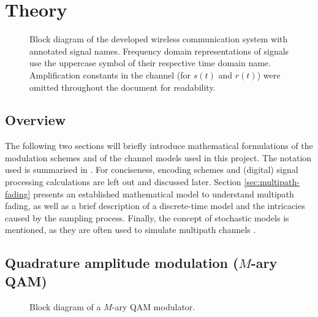 
\chapter{Theory} \label{chp:theory}

\begin{figure}
	\centering
	\resizebox{.9\linewidth}{!}{
		
	}
	\caption{
		Block diagram of the developed wireless communication system with annotated signal names. Frequency domain representations of signals use the uppercase symbol of their respective time domain name. Amplification constants in the channel (for \(s(t)\) and \(r(t)\)) were omitted throughout the document for readability.
		\label{fig:notation}
	}
\end{figure}

\section{Overview}

The following two sections will briefly introduce mathematical formulations of the modulation schemes and of the channel models used in this project. The notation used is summarised in . For conciseness, encoding schemes and (digital) signal processing calculations are left out and discussed later.  Section \ref{sec:multipath-fading} presents an established mathematical model to understand multipath fading, as well as a brief description of a discrete-time model and the intricacies caused by the sampling process. Finally, the concept of stochastic models is mentioned, as they are often used to simulate multipath channels \cite{Messier,Mathis}.


\section{Quadrature amplitude modulation (\(M\)-ary QAM)}

\begin{figure}
	\centering
	\resizebox{\linewidth}{!}{
		
	}
	\caption{
		Block diagram of a \(M\)-ary QAM modulator.
		\label{fig:quadrature-modulation}
	}
\end{figure}


